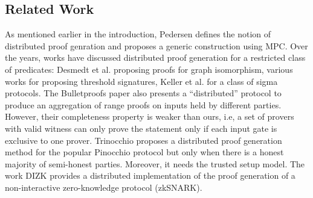 \subsection{Related Work}\label{sec:relatedwork}
As mentioned earlier in the introduction, Pedersen \cite{Ped92} defines the
notion of distributed proof genration and proposes a generic construction using
MPC. Over the years, works have discussed distributed proof generation for a
restricted class of predicates: Desmedt et al. \cite{DDB94} proposing proofs for
graph isomorphism, various works \cite{King05, DDS, Desmedt2011} for proposing
threshold signatures, Keller et al. \cite{EfficientTZ} for a class of sigma
protocols. The Bulletproofs paper \cite{bulletproofs} also presents a
``distributed'' protocol to produce an aggregation of range proofs on inputs
held by different parties. However, their completeness property is weaker than
ours, i.e, a set of provers with valid witness can only prove the statement only if each input gate is exclusive to one prover. 
Trinocchio \cite{trinocchio} proposes a distributed proof generation method for
the popular Pinocchio protocol \cite{pinnochio_PHGR} but only when there is a
honest majority of semi-honest parties. Moreover, it needs the trusted setup
model. The work DIZK \cite{dizk} provides a distributed implementation of the proof generation of a non-interactive zero-knowledge protocol (zkSNARK).


